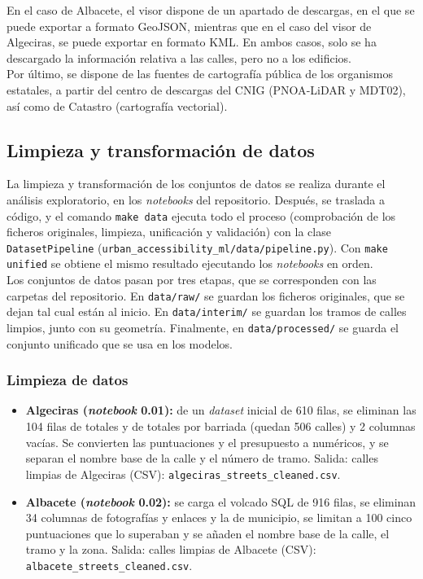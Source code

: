 En el caso de Albacete, el visor dispone de un apartado de descargas, en el que se puede exportar a formato \gls{GeoJSON}, mientras que en el caso del visor de Algeciras, se puede exportar en formato \gls{KML}. En ambos casos, solo se ha descargado la información relativa a las calles, pero no a los edificios.
\\

Por último, se dispone de las fuentes de cartografía pública de los organismos estatales, a partir del centro de descargas del \gls{CNIG} (\gls{PNOA}-\gls{LiDAR} y MDT02), así como de Catastro (cartografía vectorial).
\\

\subsection{Limpieza y transformación de datos}
\label{subsec:arq-limpieza-transformacion}

La limpieza y transformación de los conjuntos de datos se realiza durante el análisis exploratorio, en los \textit{notebooks} del repositorio. Después, se traslada a código, y el comando \texttt{make data} ejecuta todo el proceso (comprobación de los ficheros originales, limpieza, unificación y validación) con la clase \texttt{DatasetPipeline} (\texttt{urban\_accessibility\_ml/data/pipeline.py}). Con \texttt{make unified} se obtiene el mismo resultado ejecutando los \textit{notebooks} en orden.
\\

Los conjuntos de datos pasan por tres etapas, que se corresponden con las carpetas del repositorio. En \texttt{data/raw/} se guardan los ficheros originales, que se dejan tal cual están al inicio. En \texttt{data/interim/} se guardan los tramos de calles limpios, junto con su geometría. Finalmente, en \texttt{data/processed/} se guarda el conjunto unificado que se usa en los modelos.
\\

\subsubsection{Limpieza de datos}
\label{subsubsec:arq-limpieza}

\begin{itemize}
  \item \textbf{Algeciras (\textit{notebook} 0.01):} de un \textit{dataset} inicial de 610 filas, se eliminan las 104 filas de totales y de totales por barriada (quedan 506 calles) y 2 columnas vacías. Se convierten las puntuaciones y el presupuesto a numéricos, y se separan el nombre base de la calle y el número de tramo. Salida: calles limpias de Algeciras (\gls{CSV}): \texttt{algeciras\_streets\_cleaned.csv}.
  \item \textbf{Albacete (\textit{notebook} 0.02):} se carga el volcado \gls{SQL} de 916 filas, se eliminan 34 columnas de fotografías y enlaces y la de municipio, se limitan a 100 cinco puntuaciones que lo superaban y se añaden el nombre base de la calle, el tramo y la zona. Salida: calles limpias de Albacete (\gls{CSV}): \texttt{albacete\_streets\_cleaned.csv}.
\end{itemize}


